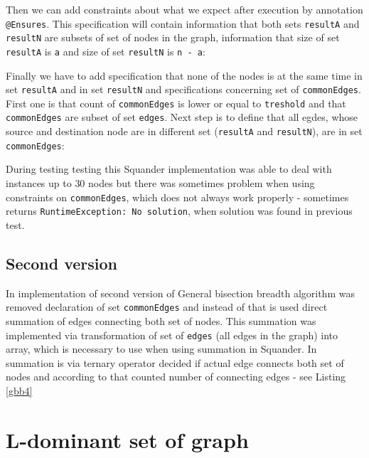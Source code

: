 \documentclass[11pt,twoside,a4paper]{book}
\begin{document}
Then we can add constraints about what we expect after execution by annotation
\verb|@Ensures|. This specification will contain information that both sets
\verb|resultA| and \verb|resultN| are subsets of set of nodes in the graph,
information that size of set \verb|resultA| is \verb|a| and size of set
\verb|resultN| is \verb|n - a|:



Finally we have to add specification that none of the nodes is at the same time
in set \verb|resultA| and in set \verb|resultN| and specifications concerning
set of \verb|commonEdges|. First one is that count of \verb|commonEdges| is
lower or equal to \verb|treshold| and that \verb|commonEdges| are subset of set
\verb|edges|. Next step is to define that all egdes, whose source and
destination node are in different set (\verb|resultA| and \verb|resultN|), are
in set \verb|commonEdges|:



During testing testing this Squander implementation was able to deal with
instances up to $30$ nodes but there was sometimes problem when using
constraints on \verb|commonEdges|, which does not always work properly -
sometimes returns \verb|RuntimeException: No solution|, when solution was found
in previous test.

\subsection{Second version}
In implementation of second version of General bisection breadth algorithm was
removed declaration of  set \verb|commonEdges| and instead of that
is used direct summation of edges connecting both set of nodes. This summation
was implemented via transformation of set of \verb|edges| (all edges in the
graph) into array, which is necessary to use when using summation in Squander.
In summation is via ternary operator decided if actual edge connects both set of
nodes and according to that counted number of connecting edges - see Listing
\ref{gbb4}



\newpage
\section{L-dominant set of graph}
\label{sec:ldsg}
\end{document}
